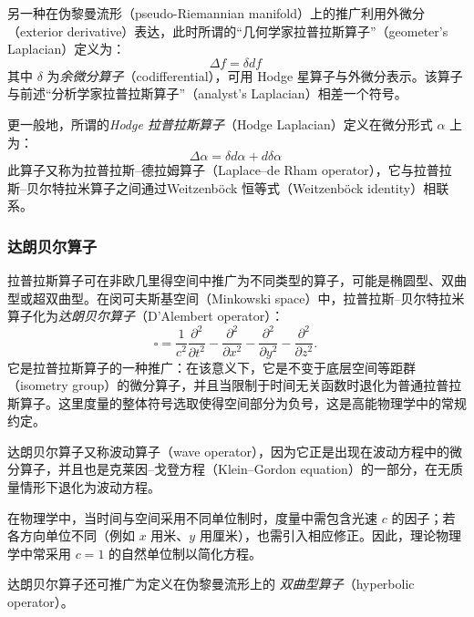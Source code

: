 另一种在伪黎曼流形（pseudo-Riemannian manifold）上的推广利用外微分（exterior derivative）表达，此时所谓的“几何学家拉普拉斯算子”（geometer’s Laplacian）定义为：
\[
\Delta f = \delta d f~
\]
其中 $\delta$ 为\emph{余微分算子}（codifferential），可用 Hodge 星算子与外微分表示。该算子与前述“分析学家拉普拉斯算子”（analyst’s Laplacian）相差一个符号。

更一般地，所谓的\emph{Hodge 拉普拉斯算子}（Hodge Laplacian）定义在微分形式 $\alpha$ 上为：
\[
\Delta \alpha = \delta d \alpha + d \delta \alpha~
\]
此算子又称为拉普拉斯–德拉姆算子（Laplace–de Rham operator），它与拉普拉斯–贝尔特拉米算子之间通过Weitzenböck 恒等式（Weitzenböck identity）相联系。
\subsubsection{达朗贝尔算子}
拉普拉斯算子可在非欧几里得空间中推广为不同类型的算子，可能是椭圆型、双曲型或超双曲型。在闵可夫斯基空间（Minkowski space）中，拉普拉斯–贝尔特拉米算子化为\emph{达朗贝尔算子}（D’Alembert operator）：
\[
\square
= \frac{1}{c^{2}} \frac{\partial^{2}}{\partial t^{2}}
- \frac{\partial^{2}}{\partial x^{2}}
- \frac{\partial^{2}}{\partial y^{2}}
- \frac{\partial^{2}}{\partial z^{2}}.~
\]
它是拉普拉斯算子的一种推广：在该意义下，它是不变于底层空间等距群（isometry group）的微分算子，并且当限制于时间无关函数时退化为普通拉普拉斯算子。这里度量的整体符号选取使得空间部分为负号，这是高能物理学中的常规约定。

达朗贝尔算子又称波动算子（wave operator），因为它正是出现在波动方程中的微分算子，并且也是克莱因–戈登方程（Klein–Gordon equation）的一部分，在无质量情形下退化为波动方程。

在物理学中，当时间与空间采用不同单位制时，度量中需包含光速 $c$ 的因子；若各方向单位不同（例如 $x$ 用米、$y$ 用厘米），也需引入相应修正。因此，理论物理学中常采用 $c = 1$ 的自然单位制以简化方程。

达朗贝尔算子还可推广为定义在伪黎曼流形上的
\emph{双曲型算子}（hyperbolic operator）。
